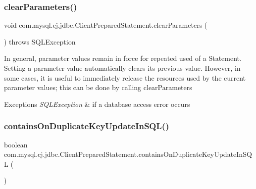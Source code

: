 \mbox{\label{classcom_1_1mysql_1_1cj_1_1jdbc_1_1_client_prepared_statement_ac5cdbe167c97f7e988f168974c07320f}} 
\subsubsection{\texorpdfstring{clear\+Parameters()}{clearParameters()}}
{\footnotesize\ttfamily void com.\+mysql.\+cj.\+jdbc.\+Client\+Prepared\+Statement.\+clear\+Parameters (\begin{DoxyParamCaption}{ }\end{DoxyParamCaption}) throws S\+Q\+L\+Exception}

In general, parameter values remain in force for repeated used of a Statement. Setting a parameter value automatically clears its previous value. However, in some cases, it is useful to immediately release the resources used by the current parameter values; this can be done by calling clear\+Parameters


\begin{DoxyExceptions}{Exceptions}
{\em S\+Q\+L\+Exception} & if a database access error occurs \\
\hline
\end{DoxyExceptions}
\mbox{\label{classcom_1_1mysql_1_1cj_1_1jdbc_1_1_client_prepared_statement_ab6bef693a8292d5c2438506df5936d3e}} 
\subsubsection{\texorpdfstring{contains\+On\+Duplicate\+Key\+Update\+In\+S\+Q\+L()}{containsOnDuplicateKeyUpdateInSQL()}}
{\footnotesize\ttfamily boolean com.\+mysql.\+cj.\+jdbc.\+Client\+Prepared\+Statement.\+contains\+On\+Duplicate\+Key\+Update\+In\+S\+QL (\begin{DoxyParamCaption}{ }\end{DoxyParamCaption})\hspace{0.3cm}{\ttfamily [protected]}}

